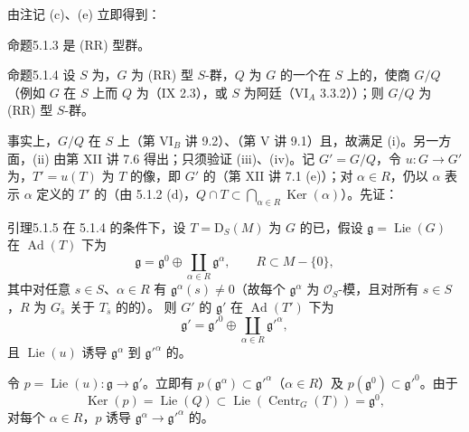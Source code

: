 由注记 (c)、(e) 立即得到：
\begin{SGAresult}{命题}{5.1.3} 是 (RR) 型群。\end{SGAresult}
\begin{SGAresult}{命题}{5.1.4} 设 $S$ 为，$G$ 为 (RR) 型 $S$-群，$Q$ 为 $G$ 的一个在 $S$ 上的，使商 $G/Q$ （例如 $G$ 在 $S$ 上而 $Q$ 为（IX 2.3），或 $S$ 为阿廷（VI$_A$ 3.3.2））；则 $G/Q$ 为 (RR) 型 $S$-群。\end{SGAresult}
事实上，$G/Q$ 在 $S$ 上（第 VI$_B$ 讲 9.2）、（第 V 讲 9.1）且，故满足 (i)。另一方面，(ii) 由第 XII 讲 7.6 得出；只须验证 (iii)、(iv)。记 $G'=G/Q$，令 $u:G\to G'$ 为，$T'=u(T)$ 为 $T$ 的像，即 $G'$ 的（第 XII 讲 7.1 (e)）；对 $\alpha\in R$，仍以 $\alpha$ 表示 $\alpha$ 定义的 $T'$ 的（由 5.1.2 (d)，$Q\cap T\subset\bigcap_{\alpha\in R}\operatorname{Ker}(\alpha)$）。先证：
\begin{SGAresult}{引理}{5.1.5} 在 5.1.4 的条件下，设 $T=\mathrm D_S(M)$ 为 $G$ 的已，假设 $\mathfrak g=\operatorname{Lie}(G)$ 在 $\operatorname{Ad}(T)$ 下为
\[\mathfrak g=\mathfrak g^0\oplus\coprod_{\alpha\in R}\mathfrak g^\alpha,\qquad R\subset M-\{0\},\]
其中对任意 $s\in S$、$\alpha\in R$ 有 $\mathfrak g^\alpha(s)\ne0$（故每个 $\mathfrak g^\alpha$ 为 $\mathcal O_S$-模，且对所有 $s\in S$，$R$ 为 $G_{\overline s}$ 关于 $T_{\overline s}$ 的的）。
则 $G'$ 的 $\mathfrak g'$ 在 $\operatorname{Ad}(T')$ 下为
\[\mathfrak g'=\mathfrak g'^0\oplus\coprod_{\alpha\in R}\mathfrak g'^\alpha,\]
且 $\operatorname{Lie}(u)$ 诱导 $\mathfrak g^\alpha$ 到 $\mathfrak g'^\alpha$ 的。
\end{SGAresult}
令 $p=\operatorname{Lie}(u):\mathfrak g\to\mathfrak g'$。立即有 $p(\mathfrak g^\alpha)\subset\mathfrak g'^\alpha$（$\alpha\in R$）及 $p(\mathfrak g^0)\subset\mathfrak g'^0$。由于
\[\operatorname{Ker}(p)=\operatorname{Lie}(Q)\subset\operatorname{Lie}(\operatorname{Centr}_G(T))=\mathfrak g^0,\]
对每个 $\alpha\in R$，$p$ 诱导 $\mathfrak g^\alpha\to\mathfrak g'^\alpha$ 的。
